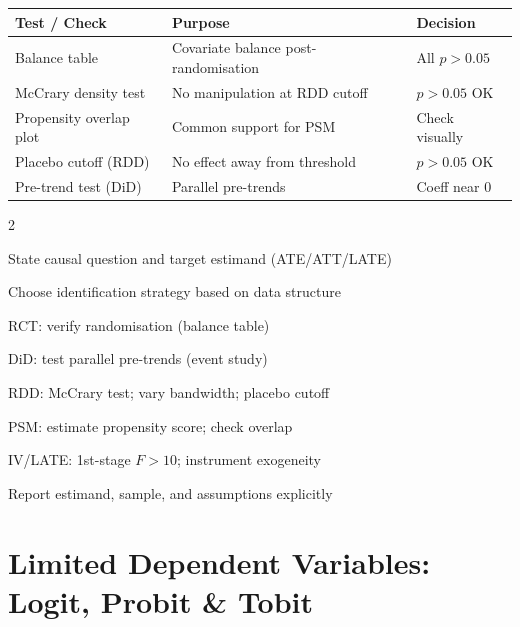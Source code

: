 \documentclass[10pt,a4paper]{article}
\begin{document}
\begin{tcolorbox}[tests]
\begin{tabularx}{\linewidth}{lXl}
\toprule
\textbf{Test / Check} & \textbf{Purpose} & \textbf{Decision} \\
\midrule
Balance table & Covariate balance post-randomisation & All $p > 0.05$ \\
\rowcolor{RowGray}
McCrary density test & No manipulation at RDD cutoff & $p > 0.05$ OK \\
Propensity overlap plot & Common support for PSM & Check visually \\
\rowcolor{RowGray}
Placebo cutoff (RDD) & No effect away from threshold & $p > 0.05$ OK \\
Pre-trend test (DiD) & Parallel pre-trends & Coeff near 0 \\
\bottomrule
\end{tabularx}
\end{tcolorbox}

\begin{tcolorbox}[checklist]
\begin{multicols}{2}
\begin{checklist}
  \item State causal question and target estimand (ATE/ATT/LATE)
  \item Choose identification strategy based on data structure
  \item RCT: verify randomisation (balance table)
  \item DiD: test parallel pre-trends (event study)
  \item RDD: McCrary test; vary bandwidth; placebo cutoff
  \item PSM: estimate propensity score; check overlap
  \item IV/LATE: 1st-stage $F > 10$; instrument exogeneity
  \item Report estimand, sample, and assumptions explicitly
\end{checklist}
\end{multicols}
\end{tcolorbox}

\newpage

\section{Limited Dependent Variables: Logit, Probit \& Tobit}
\end{document}

